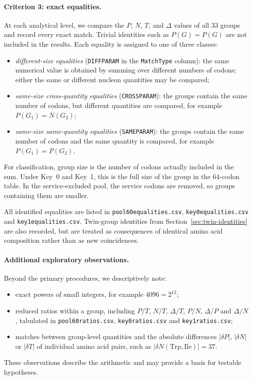 \documentclass[11pt,a4paper]{article}
\renewcommand{\_}{\origunderscore\allowbreak}
\begin{document}
\paragraph{Criterion 3: exact equalities.}
At each analytical level, we compare the $P$, $N$, $T$, and $\Delta$
values of all $33$ groups and record every exact match. Trivial
identities such as $P(G)=P(G)$ are not included in the results. Each
equality is assigned to one of three classes:
\begin{itemize}
  \item \emph{different-size equalities}
        (\texttt{DIFF\_PARAM} in the \texttt{Match\_Type} column):
        the same numerical value is obtained by summing over different
        numbers of codons; either the same or different nucleon
        quantities may be compared;
  \item \emph{same-size cross-quantity equalities}
        (\texttt{CROSS\_PARAM}): the groups contain the same number of
        codons, but different quantities are compared, for example
        $P(G_1)=N(G_2)$;
  \item \emph{same-size same-quantity equalities}
        (\texttt{SAME\_PARAM}): the groups contain the same number of
        codons and the same quantity is compared, for example
        $P(G_1)=P(G_2)$.
\end{itemize}

For classification, group size is the number of codons actually
included in the sum. Under Key~0 and Key~1, this is the full size of
the group in the $64$-codon table. In the service-excluded pool, the
service codons are removed, so groups containing them are smaller.

All identified equalities are listed in
\texttt{pool60\_equalities.csv},
\texttt{key0\_equalities.csv} and
\texttt{key1\_equalities.csv}. Twin-group identities from
Section~\ref{sec:twin-identities} are also recorded, but are treated as
consequences of identical amino acid composition rather than as new
coincidences.

\paragraph{Additional exploratory observations.}
Beyond the primary procedures, we descriptively note:
\begin{itemize}
  \item exact powers of small integers, for example
        $4096=2^{12}$;
  \item reduced ratios within a group, including $P/T$, $N/T$,
        $\Delta/T$, $P/N$, $\Delta/P$ and $\Delta/N$, tabulated in
        \texttt{pool60\_ratios.csv},
        \texttt{key0\_ratios.csv} and
        \texttt{key1\_ratios.csv};
  \item matches between group-level quantities and the absolute
        differences $|\delta P|$, $|\delta N|$ or $|\delta T|$ of
        individual amino acid pairs, such as
        $|\delta N(\mathrm{Trp},\mathrm{Ile})|=37$.
\end{itemize}
These observations describe the arithmetic and may provide a basis
for testable hypotheses.
\end{document}
